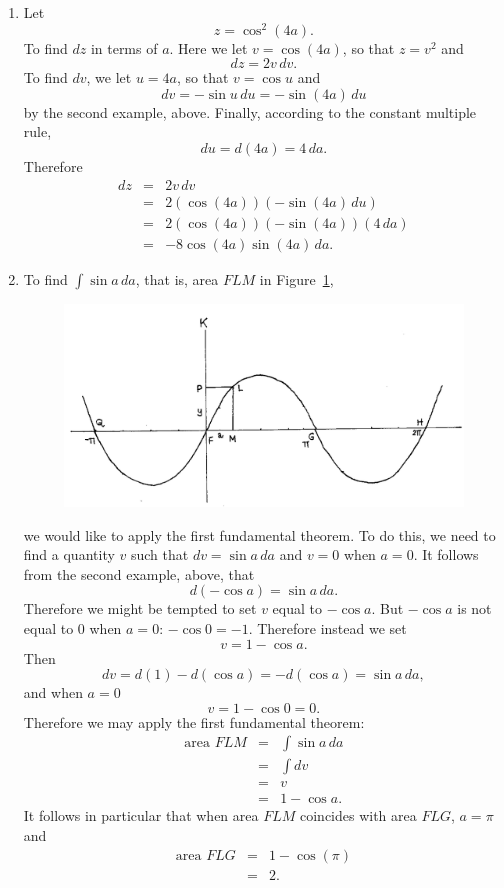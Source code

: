 \documentclass[polutonikogreek,english,twoside,openright]{article}
\begin{document}
\begin{enumerate}
\item Let 
$$z = \cos^2 (4a).$$
To find $dz$ in terms of $a$.  Here we let $v= \cos (4a)$, so that $z = v^2$ and 
$$dz = 2v\,dv.$$
To find $dv$, we let $u = 4a$, so that $v = \cos u$ and
$$dv =  -\sin u \,du = -\sin(4a)\,du$$
by the second example, above.  Finally, according to the constant multiple rule,
$$du = d(4a) = 4\,da.$$
Therefore 
\begin{eqnarray*}
dz & = & 2v\,dv\\
& = & 2(\cos(4a))(-\sin(4a)\,du)\\
& = & 2(\cos(4a))(-\sin(4a))(4\,da)\\
& = & -8\cos(4a)\sin(4a)\,da.
\end{eqnarray*}


\item \label{sumsin}To find $\int \sin a \,da$, that is, area $FLM$ in Figure~\ref{sinecurve2},
\begin{figure}[htp]
\begin{center}
\includegraphics[width=\textwidth]{fig/Figure48}
\caption{}
\label{sinecurve2}
\vspace{-10pt}
\end{center}
\end{figure} 
we would like to apply the first fundamental theorem.  To do this, we need to find a quantity $v$ such that $dv = \sin a\,da$ and $v=0$ when $a=0$.  It follows from the second example, above, that
$$d(-\cos a) = \sin a\,da.$$ 
Therefore we might be tempted to set $v$ equal to $-\cos a$.  But $-\cos a$ is not equal to 0 when $a=0$: $-\cos 0 = -1$.  Therefore instead we set 
$$v = 1-\cos a.$$
Then 
$$dv = d(1) -d(\cos a) = -d(\cos a) = \sin a\,da,$$
and when $a=0$ 
$$v = 1 - \cos 0 = 0.$$
Therefore we may apply the first fundamental theorem:
\begin{eqnarray*}
\mbox{area }FLM & = & \int\! \sin a \,da \\
& = & \int\! dv \\
& = & v\\
& = & 1 - \cos a.
\end{eqnarray*}
It follows in particular that when area $FLM$ coincides with area $FLG$, $a= \pi$ and
\begin{eqnarray*}
\mbox{area }FLG & = & 1 - \cos (\pi)\\
& = & 2.
\end{eqnarray*}


\end{enumerate}
\end{document}
